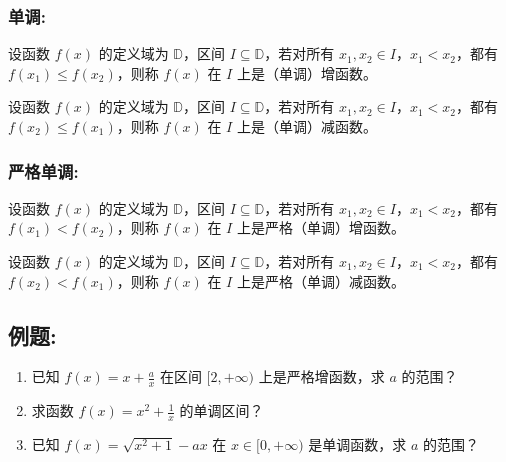 \documentclass{ctexart}
\begin{document}
\subsubsection*{\textbf{单调:}}
设函数 $f(x)$ 的定义域为 $\mathbb{D}$，区间 $I \subseteq \mathbb{D}$，若对所有 $x_1, x_2 \in I$，$x_1 < x_2$，都有 $f(x_1) \leq f(x_2)$，则称 $f(x)$ 在 $I$ 上是（单调）增函数。

设函数 $f(x)$ 的定义域为 $\mathbb{D}$，区间 $I \subseteq \mathbb{D}$，若对所有 $x_1, x_2 \in I$，$x_1 < x_2$，都有 $f(x_2) \leq f(x_1)$，则称 $f(x)$ 在 $I$ 上是（单调）减函数。

\subsubsection*{\textbf{严格单调:}}
设函数 $f(x)$ 的定义域为 $\mathbb{D}$，区间 $I \subseteq \mathbb{D}$，若对所有 $x_1, x_2 \in I$，$x_1 < x_2$，都有 $f(x_1) < f(x_2)$，则称 $f(x)$ 在 $I$ 上是严格（单调）增函数。

设函数 $f(x)$ 的定义域为 $\mathbb{D}$，区间 $I \subseteq \mathbb{D}$，若对所有 $x_1, x_2 \in I$，$x_1 < x_2$，都有 $f(x_2) < f(x_1)$，则称 $f(x)$ 在 $I$ 上是严格（单调）减函数。

\subsection*{例题:}
\begin{enumerate}
  \item 已知 $f(x) = x + \frac{a}{x}$ 在区间 $[2,+\infty)$ 上是严格增函数，求 $a$ 的范围？
  \vspace{40mm}
  \item 求函数 $f(x) = x^2 + \frac{1}{x}$ 的单调区间？
  \vspace{40mm}
  \item 已知 $f(x) = \sqrt{x^2 + 1} - ax$ 在 $x \in [0,+\infty)$ 是单调函数，求 $a$ 的范围？
  \vspace{40mm}
\end{enumerate}
\end{document}
